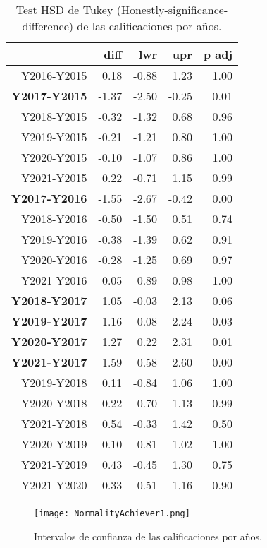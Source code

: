\begin{table}[H]
\centering
\caption{Test HSD de Tukey (Honestly-significance-difference) de las calificaciones por años.}
\label{tab:Tukeyachiever}
\begin{tabular}{rrrrr}
  \hline
 & diff & lwr & upr & p adj \\ 
  \hline
Y2016-Y2015 & 0.18 & -0.88 & 1.23 & 1.00 \\ 
  \textbf{Y2017-Y2015} & -1.37 & -2.50 & -0.25 & 0.01 \\ 
  Y2018-Y2015 & -0.32 & -1.32 & 0.68 & 0.96 \\ 
  Y2019-Y2015 & -0.21 & -1.21 & 0.80 & 1.00 \\ 
  Y2020-Y2015 & -0.10 & -1.07 & 0.86 & 1.00 \\ 
  Y2021-Y2015 & 0.22 & -0.71 & 1.15 & 0.99 \\ 
  \textbf{Y2017-Y2016} & -1.55 & -2.67 & -0.42 & 0.00 \\ 
  Y2018-Y2016 & -0.50 & -1.50 & 0.51 & 0.74 \\ 
  Y2019-Y2016 & -0.38 & -1.39 & 0.62 & 0.91 \\ 
  Y2020-Y2016 & -0.28 & -1.25 & 0.69 & 0.97 \\ 
  Y2021-Y2016 & 0.05 & -0.89 & 0.98 & 1.00 \\ 
  \textbf{Y2018-Y2017} & 1.05 & -0.03 & 2.13 & 0.06 \\ 
  \textbf{Y2019-Y2017} & 1.16 & 0.08 & 2.24 & 0.03 \\ 
  \textbf{Y2020-Y2017} & 1.27 & 0.22 & 2.31 & 0.01 \\ 
  \textbf{Y2021-Y2017} & 1.59 & 0.58 & 2.60 & 0.00 \\ 
  Y2019-Y2018 & 0.11 & -0.84 & 1.06 & 1.00 \\ 
  Y2020-Y2018 & 0.22 & -0.70 & 1.13 & 0.99 \\ 
  Y2021-Y2018 & 0.54 & -0.33 & 1.42 & 0.50 \\ 
  Y2020-Y2019 & 0.10 & -0.81 & 1.02 & 1.00 \\ 
  Y2021-Y2019 & 0.43 & -0.45 & 1.30 & 0.75 \\ 
  Y2021-Y2020 & 0.33 & -0.51 & 1.16 & 0.90 \\ 
   \hline
\end{tabular}
\end{table}

\begin{figure}[H]
    \centering
    \texttt{[image: NormalityAchiever1.png]}
    \caption{Intervalos de confianza de las calificaciones por años.}
    \label{fig:confidenceachiever}
\end{figure}

